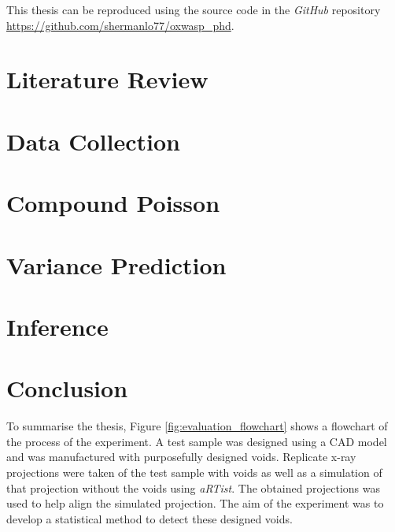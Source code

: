 \documentclass[12pt, a4paper, oneside]{memoir}
\begin{document}
This thesis can be reproduced using the source code in the \emph{GitHub} repository \url{https://github.com/shermanlo77/oxwasp_phd}.

\chapter{Literature Review}
\label{chapter1}


\chapter{Data Collection}
\label{chapter2}


\chapter{Compound Poisson}
\label{chapter3}


\chapter{Variance Prediction}
\label{chapter4}


\chapter{Inference}
\label{chapter5}


\chapter{Conclusion}
\label{chapter6}
To summarise the thesis, Figure \ref{fig:evaluation_flowchart} shows a flowchart of the process of the experiment. A test sample was designed using a CAD model and was manufactured with purposefully designed voids. Replicate x-ray projections were taken of the test sample with voids as well as a simulation of that projection without the voids using \emph{aRTist}. The obtained projections was used to help align the simulated projection. The aim of the experiment was to develop a statistical method to detect these designed voids.
\end{document}
